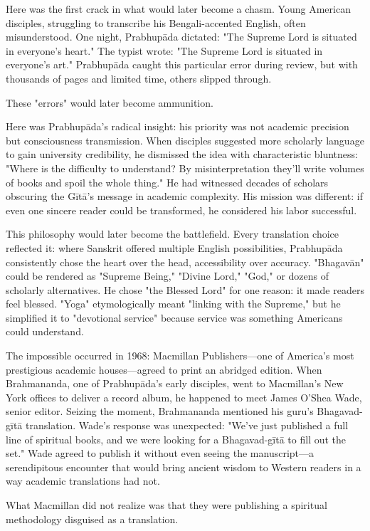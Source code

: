 \documentclass[12pt,twoside]{book}
\begin{document}
Here was the first crack in what would later become a chasm. Young American disciples, struggling to transcribe his Bengali-accented English, often misunderstood. One night, Prabhupāda dictated: "The Supreme Lord is situated in everyone's heart." The typist wrote: "The Supreme Lord is situated in everyone's art." Prabhupāda caught this particular error during review, but with thousands of pages and limited time, others slipped through.

These "errors" would later become ammunition.

Here was Prabhupāda's radical insight: his priority was not academic precision but consciousness transmission. When disciples suggested more scholarly language to gain university credibility, he dismissed the idea with characteristic bluntness: "Where is the difficulty to understand? By misinterpretation they'll write volumes of books and spoil the whole thing." He had witnessed decades of scholars obscuring the Gītā's message in academic complexity. His mission was different: if even one sincere reader could be transformed, he considered his labor successful.

This philosophy would later become the battlefield. Every translation choice reflected it: where Sanskrit offered multiple English possibilities, Prabhupāda consistently chose the heart over the head, accessibility over accuracy. "Bhagavān" could be rendered as "Supreme Being," "Divine Lord," "God," or dozens of scholarly alternatives. He chose "the Blessed Lord" for one reason: it made readers feel blessed. "Yoga" etymologically meant "linking with the Supreme," but he simplified it to "devotional service" because service was something Americans could understand.

The impossible occurred in 1968: Macmillan Publishers—one of America's most prestigious academic houses—agreed to print an abridged edition. When Brahmananda, one of Prabhupāda's early disciples, went to Macmillan's New York offices to deliver a record album, he happened to meet James O'Shea Wade, senior editor. Seizing the moment, Brahmananda mentioned his guru's Bhagavad-gītā translation. Wade's response was unexpected: "We've just published a full line of spiritual books, and we were looking for a Bhagavad-gītā to fill out the set." Wade agreed to publish it without even seeing the manuscript—a serendipitous encounter that would bring ancient wisdom to Western readers in a way academic translations had not.

What Macmillan did not realize was that they were publishing a spiritual methodology disguised as a translation.
\end{document}
